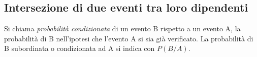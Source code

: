 
\subsection{Intersezione di due eventi tra loro dipendenti}
\begin{definizione}
Si chiama \emph{probabilità condizionata} di un evento B rispetto a un evento A, 
la probabilità di B nell'ipotesi che l'evento A si sia già verificato. La 
probabilità di B subordinata o condizionata ad A si indica con $P(B/A)$.
\end{definizione}

